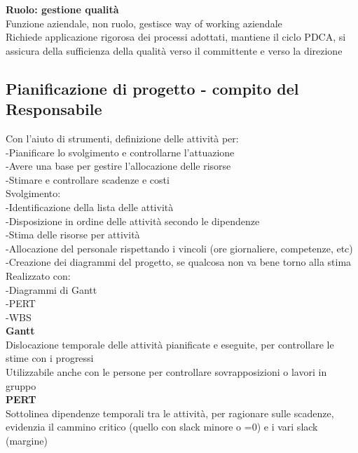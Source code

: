 \documentclass{article}
\begin{document}
		\textbf{Ruolo: gestione qualità}\\
		Funzione aziendale, non ruolo, gestisce way of working aziendale\\
		Richiede applicazione rigorosa dei processi adottati, mantiene il ciclo PDCA, si assicura della sufficienza della qualità verso il committente e verso la direzione\\
		
		\subsection{Pianificazione di progetto - compito del Responsabile}
			Con l'aiuto di strumenti, definizione delle attività per:\\
			-Pianificare lo svolgimento e controllarne l'attuazione\\
			-Avere una base per gestire l'allocazione delle risorse\\
			-Stimare e controllare scadenze e costi\\
			
			Svolgimento:\\
			-Identificazione della lista delle attività\\
			-Disposizione in ordine delle attività secondo le dipendenze\\
			-Stima delle risorse per attività\\
			-Allocazione del personale rispettando i vincoli (ore giornaliere, competenze, etc)\\
			-Creazione dei diagrammi del progetto, se qualcosa non va bene torno alla stima\\
			
			Realizzato con:\\
			-Diagrammi di Gantt\\
			-PERT\\
			-WBS\\
			
			\textbf{Gantt}\\
			Dislocazione temporale delle attività pianificate e eseguite, per controllare le stime con i progressi\\
			Utilizzabile anche con le persone per controllare sovrapposizioni o lavori in gruppo\\
			
			\textbf{PERT}\\
			Sottolinea dipendenze temporali tra le attività, per ragionare sulle scadenze, evidenzia il cammino critico (quello con slack minore o =0) e i vari slack (margine)\\
			
\end{document}
